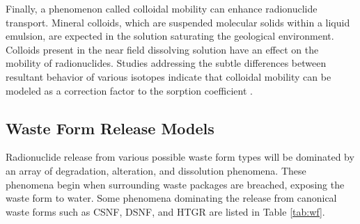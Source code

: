 




Finally, a phenomenon called colloidal mobility can enhance radionuclide 
transport. Mineral colloids, which are suspended molecular solids within a liquid 
emulsion, are expected in the solution saturating the geological environment.
Colloids present in the near field dissolving solution have an effect on the
mobility of radionuclides. Studies addressing the subtle differences between 
resultant behavior of various isotopes indicate that colloidal mobility can be 
modeled as a correction factor to the sorption coefficient 
\cite{bracke_safety_2008}.

\subsection{Waste Form Release Models}

Radionuclide release from various possible waste form types will be dominated by an 
array of degradation, alteration, and dissolution phenomena. These phenomena 
begin when surrounding waste packages are breached, exposing the waste form to 
water. Some phenomena dominating the release from canonical waste forms such as  
\gls{CSNF}, \gls{DSNF}, and \gls{HTGR} are listed in Table \ref{tab:wf}.








